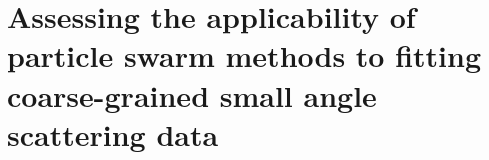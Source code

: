 
\chapter{Assessing the applicability of particle swarm methods to fitting coarse-grained small angle scattering data} %

\label{smallangle} %



\pagebreak
%
%
%
%

%
%
